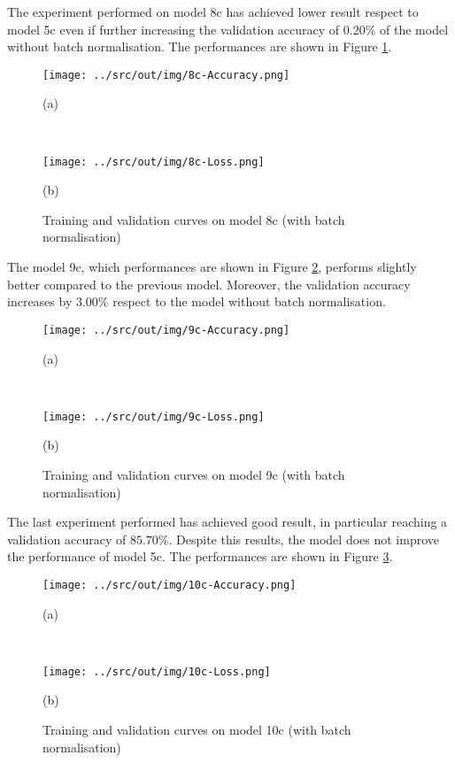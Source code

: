 \documentclass[a4paper,12pt]{article} %
\begin{document}
	The experiment performed on model 8c has achieved lower result respect to 
	model 5c even if further increasing the validation accuracy of $0.20\%$ of 
	the model without batch normalisation. 
	The performances are shown in Figure \ref{fig:model8c-performance}.
	\newline

	\begin{figure}[htb]
		\begin{minipage}[c]{.49\textwidth}
			\centering
			\texttt{[image: ../src/out/img/8c-Accuracy.png]}
			\caption*{(a)}
		\end{minipage}
		~
		\begin{minipage}[c]{.49\textwidth}
			\centering
			\texttt{[image: ../src/out/img/8c-Loss.png]}
			\caption*{(b)}
		\end{minipage}
		\caption{Training and validation curves on model 8c (with batch 
			normalisation)}
		\label{fig:model8c-performance}
	\end{figure}
	
	The model 9c, which performances are shown in Figure 
	\ref{fig:model9c-performance}, performs slightly better compared to the 
	previous model. Moreover, the validation accuracy increases by $3.00\%$ 
	respect to the model without batch normalisation.
		
	\begin{figure}[H]
		\begin{minipage}[c]{.49\textwidth}
			\centering
			\texttt{[image: ../src/out/img/9c-Accuracy.png]}
			\caption*{(a)}
		\end{minipage}
		~
		\begin{minipage}[c]{.49\textwidth}
			\centering
			\texttt{[image: ../src/out/img/9c-Loss.png]}
			\caption*{(b)}
		\end{minipage}
		\caption{Training and validation curves on model 9c (with batch 
			normalisation)}
		\label{fig:model9c-performance}
	\end{figure}
	
	The last experiment performed has achieved good result, in particular 
	reaching a validation accuracy of $85.70\%$. Despite this results, the 
	model does not improve the performance of model 5c.
	The performances are shown in Figure \ref{fig:model10c-performance}.
	\newline
	
	\begin{figure}[htb]
		\begin{minipage}[c]{.49\textwidth}
			\centering
			\texttt{[image: ../src/out/img/10c-Accuracy.png]}
			\caption*{(a)}
		\end{minipage}
		~
		\begin{minipage}[c]{.49\textwidth}
			\centering
			\texttt{[image: ../src/out/img/10c-Loss.png]}
			\caption*{(b)}
		\end{minipage}
		\caption{Training and validation curves on model 10c (with batch 
			normalisation)}
		\label{fig:model10c-performance}
	\end{figure}
\end{document}
